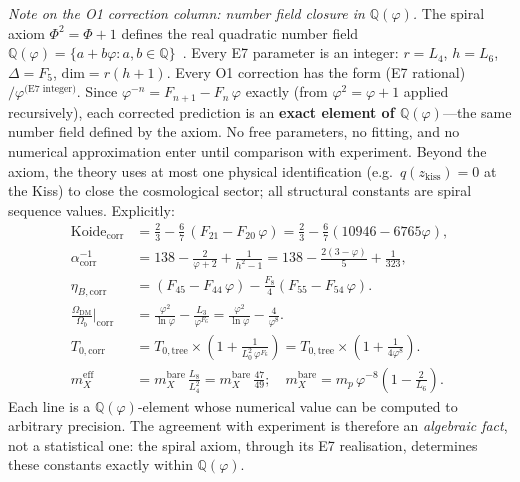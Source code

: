 \documentclass[12pt,a4paper]{article}
\begin{document}
\noindent\textit{Note on the O1 correction column: number field closure in $\mathbb{Q}(\varphi)$.}
The spiral axiom $\Phi^2 = \Phi + 1$ defines the real quadratic number field $\mathbb{Q}(\varphi) = \{a + b\varphi : a, b \in \mathbb{Q}\}$~\cite{Lang1994}.
Every E7 parameter is an integer: $r = L_4$, $h = L_6$, $\Delta = F_5$, $\mathrm{dim} = r(h{+}1)$.
Every O1 correction has the form (E7 rational)$/\varphi^{\text{(E7 integer)}}$.
Since $\varphi^{-n} = F_{n+1} - F_n\,\varphi$ exactly (from $\varphi^2 = \varphi + 1$ applied recursively), each corrected prediction is an \textbf{exact element of $\mathbb{Q}(\varphi)$}---the same number field defined by the axiom.
No free parameters, no fitting, and no numerical approximation enter until comparison with experiment. Beyond the axiom, the theory uses at most one physical identification (e.g.\ $q(z_{\mathrm{kiss}})=0$ at the Kiss) to close the cosmological sector; all structural constants are spiral sequence values.
Explicitly:
\begin{align}
\text{Koide}_{\text{corr}} &= \tfrac{2}{3} - \tfrac{6}{7}\,(F_{21} - F_{20}\,\varphi) = \tfrac{2}{3} - \tfrac{6}{7}(10946 - 6765\varphi), \label{eq:koide-qphi} \\
\alpha^{-1}_{\text{corr}} &= 138 - \tfrac{2}{\varphi+2} + \tfrac{1}{h^2{-}1} = 138 - \tfrac{2(3{-}\varphi)}{5} + \tfrac{1}{323}, \label{eq:alpha-qphi} \\
\eta_{B,\text{corr}} &= (F_{45} - F_{44}\,\varphi) - \tfrac{F_8}{4}(F_{55} - F_{54}\,\varphi). \label{eq:etab-qphi} \\
\frac{\Omega_{\mathrm{DM}}}{\Omega_b}\bigg|_{\text{corr}} &= \frac{\varphi^2}{\ln\varphi} - \frac{L_3}{\varphi^{F_6}} = \frac{\varphi^2}{\ln\varphi} - \frac{4}{\varphi^8}. \label{eq:OmDMqphi} \\
T_{0,\text{corr}} &= T_{0,\text{tree}} \times \left(1 + \frac{1}{L_0^2\,\varphi^{F_6}}\right) = T_{0,\text{tree}} \times \left(1 + \frac{1}{4\varphi^8}\right). \label{eq:T0qphi} \\
m_X^{\mathrm{eff}} &= m_X^{\mathrm{bare}}\,\frac{L_8}{L_4^2} = m_X^{\mathrm{bare}}\,\frac{47}{49}; \quad m_X^{\mathrm{bare}} = m_p\,\varphi^{-8}\left(1 - \frac{2}{L_6}\right). \label{eq:X17-fuzzy}
\end{align}
Each line is a $\mathbb{Q}(\varphi)$-element whose numerical value can be computed to arbitrary precision.  The agreement with experiment is therefore an \emph{algebraic fact}, not a statistical one: the spiral axiom, through its E7 realisation, determines these constants exactly within $\mathbb{Q}(\varphi)$.
\end{document}
